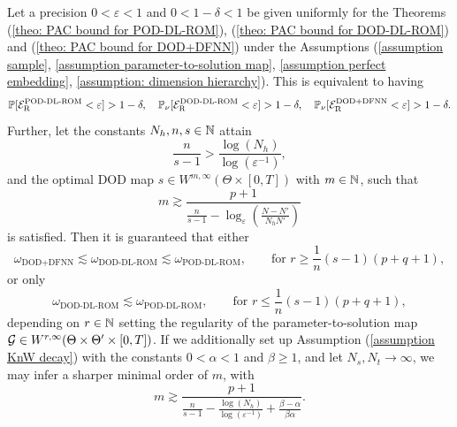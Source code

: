 \begin{proposition} \label{prop: regularity discussion for POD vs DOD}
    Let a precision $0 < \varepsilon < 1$ and $0 < 1 - \delta < 1$ be given uniformly
    for the Theorems
    (\ref{theo: PAC bound for POD-DL-ROM}), (\ref{theo: PAC bound for DOD-DL-ROM}) and 
    (\ref{theo: PAC bound for DOD+DFNN}) under the Assumptions 
    (\ref{assumption sample}, \ref{assumption parameter-to-solution map}, \ref{assumption perfect embedding}, 
    \ref{assumption: dimension hierarchy}). This is equivalent to having
    \begin{equation*}
        \mathbb{P}[\mathcal{E}_\text{R}^\text{POD-DL-ROM} < \varepsilon] > 1 - \delta, \quad
        \mathbb{P}_\nu[\mathcal{E}_\text{R}^\text{DOD-DL-ROM} < \varepsilon] > 1 - \delta, \quad
        \mathbb{P}_\nu[\mathcal{E}_\text{R}^\text{DOD+DFNN} < \varepsilon] > 1 - \delta.
    \end{equation*}
    Further, let the constants $N_h, n, s \in \mathbb{N}$ attain
    \begin{equation*}
        \frac{n}{s-1} > \frac{\log(N_h)}{\log(\varepsilon^{-1})},
    \end{equation*}
    and the optimal DOD map $s \in W^{m, \infty}(\Theta \times [0,T])$ with $m \in \mathbb{N}$,
    such that
    \begin{equation*}
        m \gtrsim \frac{p+1}{\frac{n}{s-1} - \log_\varepsilon\left(\frac{N - N'}{N_h N'}\right)}
    \end{equation*}
    is satisfied. Then it is guaranteed that either
    \begin{equation*}
        \omega_\text{DOD+DFNN} \lesssim \omega_\text{DOD-DL-ROM} \lesssim \omega_\text{POD-DL-ROM}, 
        \qquad \text{for } r \geq \frac{1}{n}(s-1)(p+q+1),
    \end{equation*}
    or only
    \begin{equation*}
        \omega_\text{DOD-DL-ROM} \lesssim \omega_\text{POD-DL-ROM},
        \qquad \text{for } r \leq \frac{1}{n}(s-1)(p+q+1),
    \end{equation*}
    depending on $r \in \mathbb{N}$ setting the regularity 
    of the parameter-to-solution map $\mathcal{G} \in W^{r, \infty}(\Theta \times \Theta' \times [0, T])$.
    If we additionally set up Assumption (\ref{assumption KnW decay}) with the constants $0 < \alpha < 1$
    and $\beta \geq 1$, and let $N_s, N_t \to \infty$, we may infer a sharper minimal order of $m$, with
    \begin{equation*}
        m \gtrsim \frac{p+1}{\frac{n}{s-1} - \frac{\log(N_h)}{\log(\varepsilon^{-1})} + 
        \frac{\beta - \alpha}{\beta \alpha}}.
    \end{equation*}
\end{proposition}
